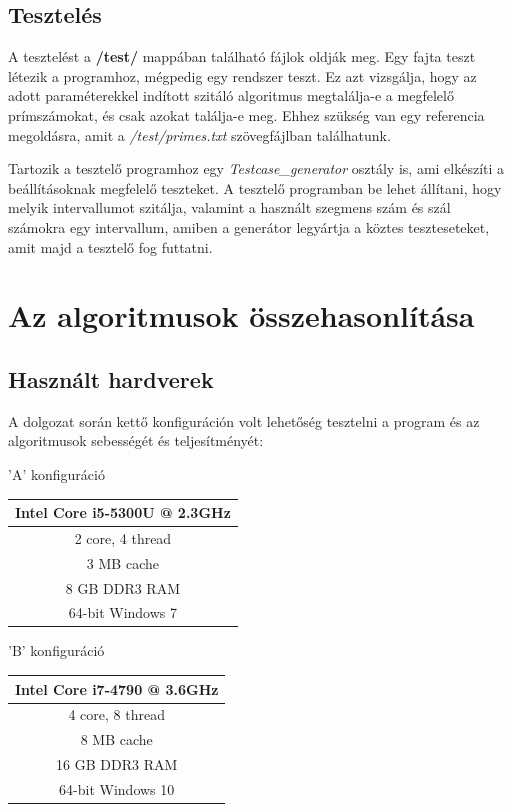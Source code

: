 \documentclass[twoside, a4paper, 12pt]{article}
\begin{document}
\subsection{Tesztelés} \label{test}

A tesztelést a \textbf{/test/} mappában található fájlok oldják meg. Egy fajta teszt létezik a programhoz, mégpedig egy rendszer teszt. Ez azt vizsgálja, hogy az adott paraméterekkel indított szitáló algoritmus megtalálja-e a megfelelő prímszámokat, és csak azokat találja-e meg. Ehhez szükség van egy referencia megoldásra, amit a \textit{/test/primes.txt} szövegfájlban találhatunk. \par
 Tartozik a tesztelő programhoz egy \textit{Testcase\_generator} osztály is, ami elkészíti a beállításoknak megfelelő teszteket. A tesztelő programban be lehet állítani, hogy melyik intervallumot szitálja, valamint a használt szegmens szám és szál számokra egy intervallum, amiben a generátor legyártja a köztes teszteseteket, amit majd a tesztelő fog futtatni.

\clearpage
\section{Az algoritmusok összehasonlítása}

\subsection{Használt hardverek}

A dolgozat során kettő konfiguráción volt lehetőség tesztelni a program és az algoritmusok sebességét és teljesítményét: \bigskip \bigskip \bigskip

'A' konfiguráció ~~~~~~~~
\begin{tabular}{ | c | }
  \hline
  Intel Core i5-5300U @ 2.3GHz \\ \hline
  2 core, 4 thread \\ \hline
  3 MB cache \\ \hline
  8 GB DDR3 RAM\\ \hline
  64-bit Windows 7 \\
  \hline
\end{tabular}

\bigskip \bigskip

'B' konfiguráció ~~~~~~~~
\begin{tabular}{ | c | }
  \hline
  Intel Core i7-4790 @ 3.6GHz \\ \hline
  4 core, 8 thread \\ \hline
  8 MB cache \\ \hline
  16 GB DDR3 RAM\\ \hline
  64-bit Windows 10 \\
  \hline
\end{tabular}
\end{document}
